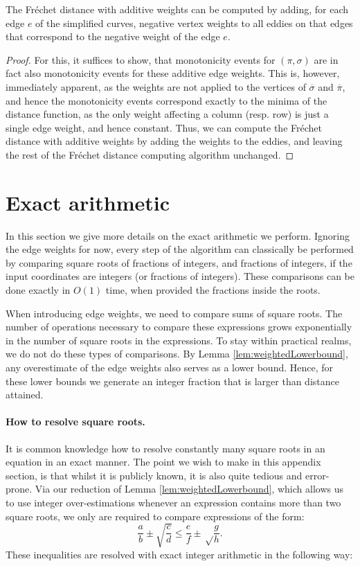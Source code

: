 \begin{lemma}
    The Fréchet distance with additive weights can be computed by adding, for each edge $e$ of the simplified curves, negative vertex weights to all eddies on that edges that correspond to the negative weight of the edge $e$. 
\end{lemma}
\begin{proof}
    For this, it suffices to show, that monotonicity events for $(\pi, \sigma)$ are in fact also monotonicity events for these additive edge weights. This is, however, immediately apparent, as the weights are not applied to the vertices of $\overline{\sigma}$ and $\overline{\pi}$, and hence the monotonicity events correspond exactly to the minima of the distance function, as the only weight affecting a column (resp. row) is just a single edge weight, and hence constant. Thus, we can compute the Fréchet distance with additive weights by adding the weights to the eddies, and leaving the rest of the Fréchet distance computing algorithm unchanged.
\end{proof}




\section{Exact arithmetic}
\label{sec:exact}
    In this section we give more details on the exact arithmetic we perform. Ignoring the edge weights for now, every step of the algorithm can classically be performed by comparing square roots of fractions of integers, and fractions of integers, if the input coordinates are integers (or fractions of integers). These comparisons can be done exactly in $O(1)$ time, when provided the fractions inside the roots.

    When introducing edge weights, we need to compare sums of square roots. The number of operations necessary to compare these expressions grows exponentially in the number of square roots in the expressions. To stay within practical realms, we do not do these types of comparisons. By Lemma \ref{lem:weightedLowerbound}, any overestimate of the edge weights also serves as a lower bound. Hence, for these lower bounds we generate an integer fraction that is larger than distance attained.
    
    
    \paragraph*{How to resolve square roots.}
    It is common knowledge how to resolve constantly many square roots in an equation in an exact manner.
    The point we wish to make in this appendix section, is that whilst it is publicly known, it is also quite tedious and error-prone.
    Via our reduction of Lemma \ref{lem:weightedLowerbound}, which allows us to use integer over-estimations whenever an expression contains more than two square roots, we only are required to compare expressions of the form:  \[\frac{a}{b}\pm\sqrt{\frac{c}{d}}\leq\frac{e}{f}\pm\sqrt\frac{g}{h}.\]
    These inequalities are  resolved with exact integer arithmetic in the following way:
    
